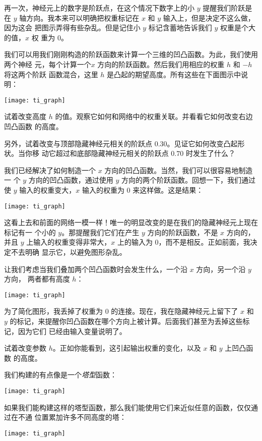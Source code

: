 再一次，神经元上的数字是阶跃点，在这个情况下数字上的小 $y$ 提醒我们阶跃是在 $y$
轴方向。我本来可以明确把权重标记在 $x$ 和 $y$ 输入上，但是决定不这么做，因为这会
把图示弄得有些杂乱。但是记住小 $y$ 标记含蓄地告诉我们 $y$ 权重是个大的值，$x$ 权
重为 $0$。

我们可以用我们刚刚构造的阶跃函数来计算一个三维的凹凸函数。为此，我们使用两个神经
元，每个计算一个$x$ 方向的阶跃函数。然后我们用相应的权重 $h$ 和 $-h$ 将这两个阶跃
函数混合，这里 $h$ 是凸起的期望高度。所有这些在下面图示中说明：
\begin{center}
  \texttt{[image: ti\_graph]}
\end{center}

试着改变高度 $h$ 的值。观察它如何和网络中的权重关联。并看看它如何改变右边凹凸函数
的高度。

另外，试着改变与顶部隐藏神经元相关的阶跃点 $0.30$。见证它如何改变凸起形状。当你移
动它超过和底部隐藏神经元相关的阶跃点 $0.70$ 时发生了什么？

我们已经解决了如何制造一个 $x$ 方向的凹凸函数。当然，我们可以很容易地制造一
个 $y$ 方向的凹凸函数，通过使用 $y$ 方向的两个阶跃函数。回想一下，我们通过使 $y$
输入的权重变大，$x$ 输入的权重为 $0$ 来这样做。这是结果：
\begin{center}
  \texttt{[image: ti\_graph]}
\end{center}

这看上去和前面的网络一模一样！唯一的明显改变的是在我们的隐藏神经元上现在标记有一
个小的 $y$。那提醒我们它们在产生 $y$ 方向的阶跃函数，不是 $x$ 方向的，并且 $y$
上输入的权重变得非常大，$x$ 上的输入为 $0$，而不是相反。正如前面，我决定不去明确
显示它，以避免图形杂乱。

让我们考虑当我们叠加两个凹凸函数时会发生什么，一个沿 $x$ 方向，另一个沿 $y$ 方向，
两者都有高度 $h$：
\begin{center}
  \texttt{[image: ti\_graph]}
\end{center}

为了简化图形，我丢掉了权重为 $0$ 的连接。现在，我在隐藏神经元上留下了 $x$ 和 $y$
的标记，来提醒你凹凸函数在哪个方向上被计算。后面我们甚至为丢掉这些标记，因为它们
已经由输入变量说明了。

试着改变参数 $h$。正如你能看到，这引起输出权重的变化，以及 $x$ 和 $y$ 上凹凸函数
的高度。

我们构建的有点像是一个\emph{塔型}函数：
\begin{center}
  \texttt{[image: ti\_graph]}
\end{center}

如果我们能构建这样的塔型函数，那么我们能使用它们来近似任意的函数，仅仅通过在不通
位置累加许多不同高度的塔：
\begin{center}
  \texttt{[image: ti\_graph]}
\end{center}

